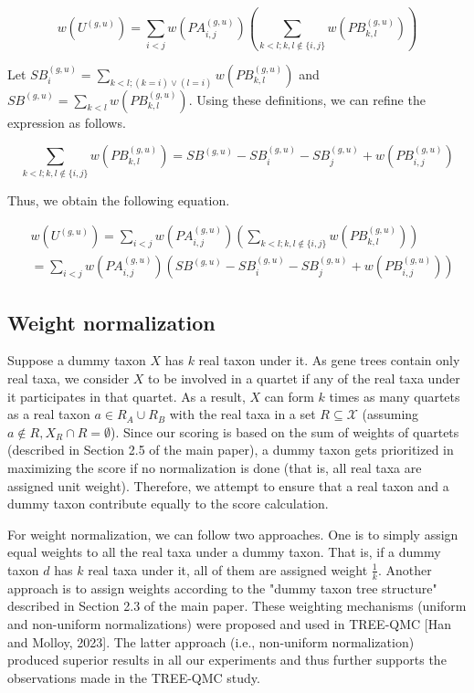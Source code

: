 \documentclass{article}
\begin{document}
\[
w\left(U^{(g, u)}\right) = \sum_{i<j} w\left(P A_{i, j}^{(g, u)}\right) \left( \sum_{k<l ; k, l \notin \{i, j\}} w\left(P B_{k, l}^{(g, u)}\right) \right)
\]

Let $S B_i^{(g, u)} = \sum_{k<l ; (k=i) \vee (l=i)} w\left(P B_{k, l}^{(g, u)}\right)$ and $S B^{(g, u)} = \sum_{k<l} w\left(P B_{k, l}^{(g, u)}\right)$. Using these definitions, we can refine the expression as follows.

\[
\sum_{k<l ; k, l \notin \{i, j\}} w\left(P B_{k, l}^{(g, u)}\right) = S B^{(g, u)} - S B_i^{(g, u)} - S B_j^{(g, u)} + w\left(P B_{i, j}^{(g, u)}\right)
\]

Thus, we obtain the following equation.

\[
\begin{aligned}
& w\left(U^{(g, u)}\right) = \sum_{i<j} w\left(P A_{i, j}^{(g, u)}\right) \left( \sum_{k<l ; k, l \notin \{i, j\}} w\left(P B_{k, l}^{(g, u)}\right) \right) \\
& = \sum_{i<j} w\left(P A_{i, j}^{(g, u)}\right) \left( S B^{(g, u)} - S B_i^{(g, u)} - S B_j^{(g, u)} + w\left(P B_{i, j}^{(g, u)}\right) \right)
\end{aligned}
\]

\subsection{Weight normalization}

Suppose a dummy taxon $X$ has $k$ real taxon under it. As gene trees contain only real taxa, we consider $X$ to be involved in a quartet if any of the real taxa under it participates in that quartet. As a result, $X$ can form $k$ times as many quartets as a real taxon $a \in R_A \cup R_B$ with the real taxa in a set $R \subseteq \mathcal{X}$ (assuming $a \notin R, X_R \cap R = \emptyset$). Since our scoring is based on the sum of weights of quartets (described in Section 2.5 of the main paper), a dummy taxon gets prioritized in maximizing the score if no normalization is done (that is, all real taxa are assigned unit weight). Therefore, we attempt to ensure that a real taxon and a dummy taxon contribute equally to the score calculation.

For weight normalization, we can follow two approaches. One is to simply assign equal weights to all the real taxa under a dummy taxon. That is, if a dummy taxon $d$ has $k$ real taxa under it, all of them are assigned weight $\frac{1}{k}$. Another approach is to assign weights according to the "dummy taxon tree structure" described in Section 2.3 of the main paper. These weighting mechanisms (uniform and non-uniform normalizations) were proposed and used in TREE-QMC [Han and Molloy, 2023]. The latter approach (i.e., non-uniform normalization) produced superior results in all our experiments and thus further supports the observations made in the TREE-QMC study.
\end{document}
